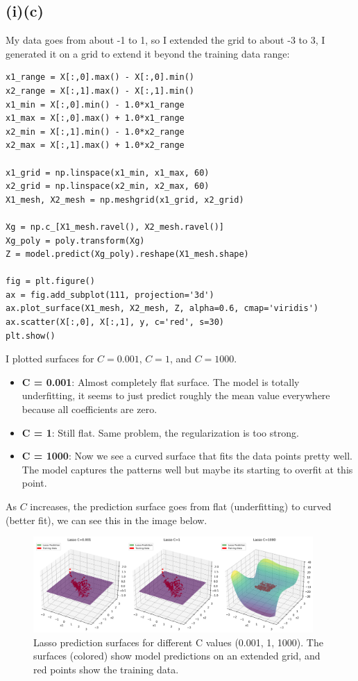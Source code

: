 \documentclass[11pt,a4paper]{article}
\begin{document}
\subsection*{(i)(c)}

My data goes from about -1 to 1, so I extended the grid to about -3 to 3, I generated it on a grid to extend it beyond the training data range:

\begin{lstlisting}
x1_range = X[:,0].max() - X[:,0].min()
x2_range = X[:,1].max() - X[:,1].min()
x1_min = X[:,0].min() - 1.0*x1_range
x1_max = X[:,0].max() + 1.0*x1_range
x2_min = X[:,1].min() - 1.0*x2_range
x2_max = X[:,1].max() + 1.0*x2_range

x1_grid = np.linspace(x1_min, x1_max, 60)
x2_grid = np.linspace(x2_min, x2_max, 60)
X1_mesh, X2_mesh = np.meshgrid(x1_grid, x2_grid)

Xg = np.c_[X1_mesh.ravel(), X2_mesh.ravel()]
Xg_poly = poly.transform(Xg)
Z = model.predict(Xg_poly).reshape(X1_mesh.shape)

fig = plt.figure()
ax = fig.add_subplot(111, projection='3d')
ax.plot_surface(X1_mesh, X2_mesh, Z, alpha=0.6, cmap='viridis')
ax.scatter(X[:,0], X[:,1], y, c='red', s=30)
plt.show()
\end{lstlisting}

I plotted surfaces for $C = 0.001$, $C = 1$, and $C = 1000$.

\begin{itemize}
    \item \textbf{C = 0.001}: Almost completely flat surface. The model is totally underfitting, it seems to just predict roughly the mean value everywhere because all coefficients are zero.
    
    \item \textbf{C = 1}: Still flat. Same problem, the regularization is too strong.
    
    \item \textbf{C = 1000}: Now we see a curved surface that fits the data points pretty well. The model captures the patterns well but maybe its starting to overfit at this point.
\end{itemize}

As $C$ increases, the prediction surface goes from flat (underfitting) to curved (better fit), we can see this in the image below.

\begin{figure}[H]
\centering
\includegraphics[width=0.95\textwidth]{figures/03_lasso_prediction_surfaces.png}
\caption{Lasso prediction surfaces for different C values (0.001, 1, 1000). The surfaces (colored) show model predictions on an extended grid, and red points show the training data.}
\label{fig:lasso_surfaces}
\end{figure}
\end{document}
